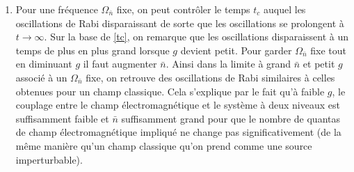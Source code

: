 {\begin{enumerate}
    \item Pour une fréquence $\Omega_{\bar{n}}$ fixe, on peut contrôler le temps $t_c$ auquel les oscillations de Rabi disparaissant  de sorte que les oscillations se prolongent à $t \to \infty$. Sur la base de \eqref{tc}, on remarque que les oscillations disparaissent à un temps de plus en plus grand lorsque $g$ devient petit. Pour garder $\Omega_{\bar{n}}$ fixe tout en diminuant $g$ il faut augmenter $\bar{n}$. Ainsi dans la limite à grand $\bar{n}$ et petit $g$ associé à un $\Omega_{\bar{n}}$ fixe, on retrouve des oscillations de Rabi similaires à celles obtenues pour un champ classique. Cela s'explique par le fait qu'à faible $g$, le couplage entre le champ électromagnétique et le système à deux niveaux est suffisamment faible et $\bar{n}$ suffisamment grand pour que le nombre de quantas de champ électromagnétique impliqué ne change pas significativement (de la même manière qu'un champ classique qu'on prend comme une source imperturbable). 
\end{enumerate}
}